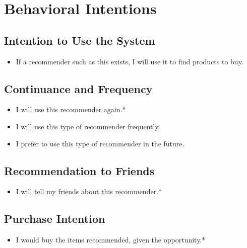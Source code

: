 \section{Behavioral Intentions}

\subsection{Intention to Use the System}

\begin{itemize}
\item If a recommender such as this exists, I will use it to find products to buy.
\end{itemize}

\subsection{Continuance and Frequency}

\begin{itemize}
\item I will use this recommender again.*
\item I will use this type of recommender frequently.
\item I prefer to use this type of recommender in the future.
\end{itemize}

\subsection{Recommendation to Friends}

\begin{itemize}
\item I will tell my friends about this recommender.*
\end{itemize}

\subsection{Purchase Intention}

\begin{itemize}
\item I would buy the items recommended, given the opportunity.*
\end{itemize}
